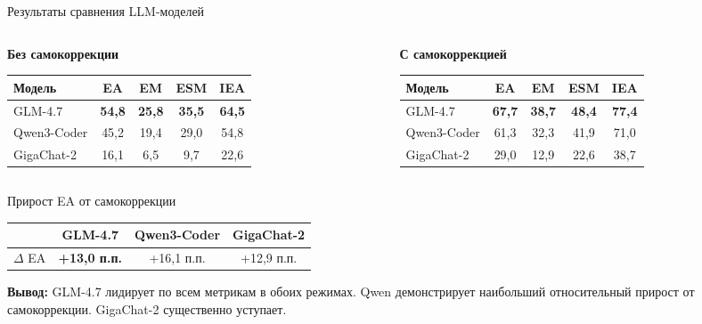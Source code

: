 \documentclass[10pt, aspectratio=169, unicode]{beamer}
\begin{document}
\begin{frame}{Результаты сравнения LLM-моделей}
  \begin{columns}[T]
    \begin{column}{0.48\textwidth}
      \centering
      \textbf{Без самокоррекции}
      \begin{table}
        \small
        \begin{tabular}{|l|c|c|c|c|}
          \hline
          \textbf{Модель} & \textbf{EA} & \textbf{EM} & \textbf{ESM} & \textbf{IEA} \\
          \hline
          GLM-4.7      & \textbf{54,8} & \textbf{25,8} & \textbf{35,5} & \textbf{64,5} \\
          Qwen3-Coder  & 45,2 & 19,4 & 29,0 & 54,8 \\
          GigaChat-2   & 16,1 &  6,5 &  9,7 & 22,6 \\
          \hline
        \end{tabular}
      \end{table}
    \end{column}
    \begin{column}{0.48\textwidth}
      \centering
      \textbf{С самокоррекцией}
      \begin{table}
        \small
        \begin{tabular}{|l|c|c|c|c|}
          \hline
          \textbf{Модель} & \textbf{EA} & \textbf{EM} & \textbf{ESM} & \textbf{IEA} \\
          \hline
          GLM-4.7      & \textbf{67,7} & \textbf{38,7} & \textbf{48,4} & \textbf{77,4} \\
          Qwen3-Coder  & 61,3 & 32,3 & 41,9 & 71,0 \\
          GigaChat-2   & 29,0 & 12,9 & 22,6 & 38,7 \\
          \hline
        \end{tabular}
      \end{table}
    \end{column}
  \end{columns}

  \vspace{6pt}
  \begin{block}{Прирост EA от самокоррекции}
    \centering
    \begin{tabular}{lccc}
      \toprule
      & GLM-4.7 & Qwen3-Coder & GigaChat-2 \\
      \midrule
      $\Delta$ EA & \textbf{+13,0 п.п.} & +16,1 п.п. & +12,9 п.п. \\
      \bottomrule
    \end{tabular}
  \end{block}

  {\small \textbf{Вывод:} GLM-4.7 лидирует по всем метрикам в обоих режимах. Qwen демонстрирует наибольший относительный прирост от самокоррекции. GigaChat-2 существенно уступает.}
\end{frame}
\end{document}
